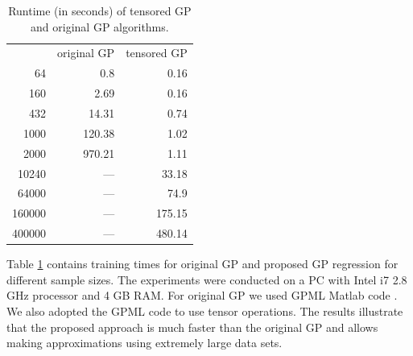 \begin{table}[t]
  \caption{Runtime (in seconds) of tensored GP and original GP algorithms.}
  \label{tb:runtime}
  \vskip 0.15in
  \begin{center}
    \begin{small}
      \begin{sc}
        \begin{tabular}{rrr}
          \hline
          & original GP   & tensored GP \\
          64     & 0.8    & 0.16 \\
          160    & 2.69   & 0.16 \\
          432    & 14.31  & 0.74 \\
          1000   & 120.38 & 1.02 \\
          2000   & 970.21 & 1.11 \\
          10240  & ---    & 33.18 \\
          64000  & ---    & 74.9 \\
          160000 & ---    & 175.15 \\
          400000 & ---    & 480.14\\
          \hline
        \end{tabular}
      \end{sc}
    \end{small}
  \end{center}
  \vskip -0.1in
\end{table}

Table \ref{tb:runtime} contains training times for
original GP and proposed GP regression for different sample sizes.
The experiments were conducted on a PC with Intel i7 2.8 GHz processor and
4 GB RAM.
For original GP we used GPML Matlab code \citep{gpmltoolbox}.
We also adopted the GPML code to use tensor operations.
The results illustrate that the proposed approach is much faster than the original GP
and allows making approximations using extremely large data sets.

